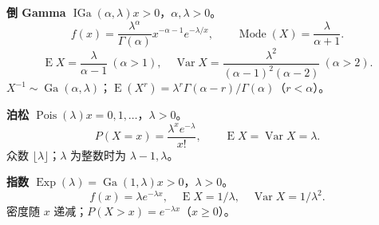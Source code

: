 \documentclass[UTF8,a4paper,fontset=windows]{ctexart}
\newcommand{\Ga}{\operatorname{Ga}}
\newcommand{\IG}{\operatorname{IGa}}
\newcommand{\Poi}{\operatorname{Pois}}
\newcommand{\Exp}{\operatorname{Exp}}
\newcommand{\E}{\operatorname{E}}
\newcommand{\Var}{\operatorname{Var}}
\newcommand{\sub}[1]{\par\vspace{2pt}\textbf{#1}\enspace}
\begin{document}
{\begin{minipage}[t]{.487\textwidth}
\sub{倒 Gamma $\IG(\alpha,\lambda)$}$x>0$，$\alpha,\lambda>0$。
\[
 f(x)=\frac{\lambda^\alpha}{\Gamma(\alpha)}x^{-\alpha-1}e^{-\lambda/x},\qquad
 \operatorname{Mode}(X)=\frac \lambda{\alpha+1}.
\]
\[
 \E X=\frac \lambda{\alpha-1}\ (\alpha>1),\quad
 \Var X=\frac{\lambda^2}{(\alpha-1)^2(\alpha-2)}\ (\alpha>2).
\]
$X^{-1}\sim\Ga(\alpha,\lambda)$；$\E(X^r)=\lambda^r\Gamma(\alpha-r)/\Gamma(\alpha)$（$r<\alpha$）。

\sub{泊松 $\Poi(\lambda)$}$x=0,1,\ldots$，$\lambda>0$。
\[
 P(X=x)=\frac{\lambda^xe^{-\lambda}}{x!},\qquad\E X=\Var X=\lambda.
\]
众数 $\lfloor\lambda\rfloor$；$\lambda$ 为整数时为 $\lambda-1,\lambda$。

\sub{指数 $\Exp(\lambda)=\Ga(1,\lambda)$}$x>0$，$\lambda>0$。
\[
 f(x)=\lambda e^{-\lambda x},\quad\E X=1/\lambda,\quad\Var X=1/\lambda^2.
\]
密度随 $x$ 递减；$P(X>x)=e^{-\lambda x}$（$x\ge0$）。
\end{minipage}}
\end{document}
